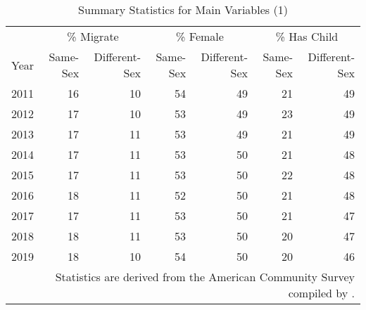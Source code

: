 \begin{table}[htbp]
\centering
\caption{Summary Statistics for Main Variables (1)}
\label{var_table_1} %
\begin{tabular}[t]{rrrrrrr}
\toprule
\multicolumn{1}{c}{ } & \multicolumn{2}{c}{\% Migrate} & \multicolumn{2}{c}{\% Female} & \multicolumn{2}{c}{\% Has Child} \\
\cmidrule(l{3pt}r{3pt}){2-3} \cmidrule(l{3pt}r{3pt}){4-5} \cmidrule(l{3pt}r{3pt}){6-7}
Year & Same-Sex & Different-Sex & Same-Sex & Different-Sex & Same-Sex & Different-Sex\\
\midrule
2011 & 16 & 10 & 54 & 49 & 21 & 49\\
2012 & 17 & 10 & 53 & 49 & 23 & 49\\
2013 & 17 & 11 & 53 & 49 & 21 & 49\\
2014 & 17 & 11 & 53 & 50 & 21 & 48\\
2015 & 17 & 11 & 53 & 50 & 22 & 48\\
2016 & 18 & 11 & 52 & 50 & 21 & 48\\
2017 & 17 & 11 & 53 & 50 & 21 & 47\\
2018 & 18 & 11 & 53 & 50 & 20 & 47\\
2019 & 18 & 10 & 54 & 50 & 20 & 46\\
\bottomrule
\multicolumn{7}{p{\linewidth}}{\footnotesize Statistics are derived from the American Community Survey compiled by \citet{28}.} \\
\end{tabular}
\end{table}
